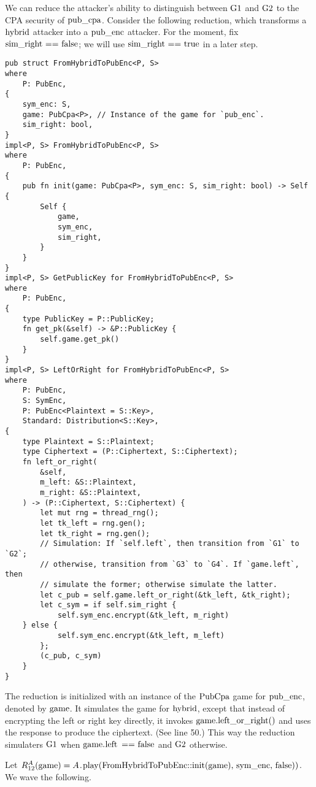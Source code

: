 We can reduce the attacker's ability to distinguish between $\code{G1}$ and
$\code{G2}$ to the CPA security of $\code{pub_cpa}$.
%
Consider the following reduction, which transforms a $\code{hybrid}$ attacker
into a $\code{pub_enc}$ attacker. For the moment, fix $\code{sim_right ==
false}$; we will use $\code{sim_right == true}$ in a later step.
%
\begin{lstlisting}
pub struct FromHybridToPubEnc<P, S>
where
    P: PubEnc,
{
    sym_enc: S,
    game: PubCpa<P>, // Instance of the game for `pub_enc`.
    sim_right: bool,
}
impl<P, S> FromHybridToPubEnc<P, S>
where
    P: PubEnc,
{
    pub fn init(game: PubCpa<P>, sym_enc: S, sim_right: bool) -> Self {
        Self {
            game,
            sym_enc,
            sim_right,
        }
    }
}
impl<P, S> GetPublicKey for FromHybridToPubEnc<P, S>
where
    P: PubEnc,
{
    type PublicKey = P::PublicKey;
    fn get_pk(&self) -> &P::PublicKey {
        self.game.get_pk()
    }
}
impl<P, S> LeftOrRight for FromHybridToPubEnc<P, S>
where
    P: PubEnc,
    S: SymEnc,
    P: PubEnc<Plaintext = S::Key>,
    Standard: Distribution<S::Key>,
{
    type Plaintext = S::Plaintext;
    type Ciphertext = (P::Ciphertext, S::Ciphertext);
    fn left_or_right(
        &self,
        m_left: &S::Plaintext,
        m_right: &S::Plaintext,
    ) -> (P::Ciphertext, S::Ciphertext) {
        let mut rng = thread_rng();
        let tk_left = rng.gen();
        let tk_right = rng.gen();
        // Simulation: If `self.left`, then transition from `G1` to `G2`;
        // otherwise, transition from `G3` to `G4`. If `game.left`, then
        // simulate the former; otherwise simulate the latter.
        let c_pub = self.game.left_or_right(&tk_left, &tk_right);
        let c_sym = if self.sim_right {
            self.sym_enc.encrypt(&tk_left, m_right)
    } else {
            self.sym_enc.encrypt(&tk_left, m_left)
        };
        (c_pub, c_sym)
    }
}
\end{lstlisting}
%
The reduction is initialized with an instance of the $\code{PubCpa}$ game for
$\code{pub_enc}$, denoted by $\code{game}$. It simulates the game for
$\code{hybrid}$, except that instead of encrypting the left or right key
directly, it invokes $\code{game.left_or_right()}$ and uses the response to
produce the ciphertext. (See line 50.) This way the reduction simulaters
$\code{G1}$ when $\code{game.left == false}$ and $\code{G2}$ otherwise.

Let $R_{\code{12}}^A(\code{game}) =
A\code{.play(FromHybridToPubEnc::init(game), sym_enc, false))}$.
%
We wave the following.
%

